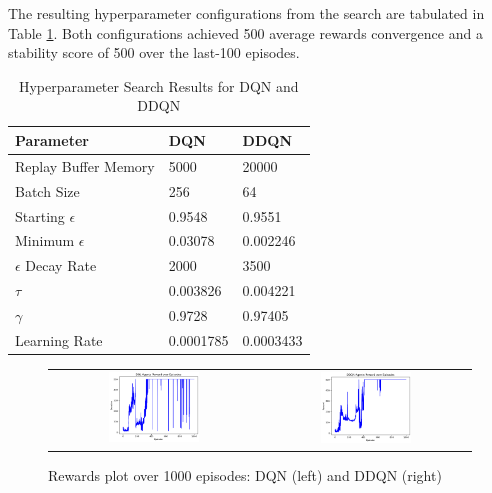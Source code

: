 \documentclass{article}
\begin{document}
The resulting hyperparameter configurations from the search are tabulated in Table \ref{tab:hyperparameters_result}. Both configurations achieved 500 average rewards convergence and a stability score of 500 over the last-100 episodes.
\begin{table}[!ht]
\centering
\begin{tabular}{|l|l|l|}
\hline
\textbf{Parameter}  & \textbf{DQN}  & \textbf{DDQN} \\ \hline
Replay Buffer Memory         & 5000          & 20000         \\ \hline
Batch Size          & 256           & 64            \\ \hline
Starting $\epsilon$    & 0.9548        & 0.9551        \\ \hline
Minimum $\epsilon$      & 0.03078       & 0.002246      \\ \hline
$\epsilon$ Decay Rate    & 2000          & 3500          \\ \hline
$\tau$              & 0.003826      & 0.004221      \\ \hline
$\gamma$            & 0.9728        & 0.97405       \\ \hline
Learning Rate       & 0.0001785     & 0.0003433     \\ \hline
\end{tabular}
\caption{Hyperparameter Search Results for DQN and DDQN}
\label{tab:hyperparameters_result}
\end{table}

\begin{figure}[!ht]
    \centering
    \begin{tabular}{c c}    
    \includegraphics[width=0.45\textwidth]{DQN_rewards.png}
    &
    \includegraphics[width=0.45\textwidth]{DDQN_rewards.png}
    \end{tabular}
    \caption{Rewards plot over 1000 episodes: DQN (left) and DDQN (right)}
    \label{figure: diag_plot_lpft}
\end{figure}
\end{document}
